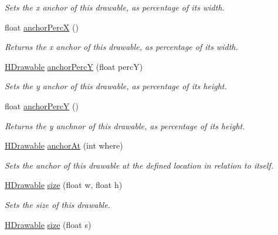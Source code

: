 \begin{DoxyCompactItemize}
\begin{DoxyCompactList}\small\item\em Sets the x anchor of this drawable, as percentage of its width. \end{DoxyCompactList}\item 
float \hyperlink{classhype_1_1drawable_1_1_h_drawable_a4c0158fa8194cfe3424714f16e700b5e}{anchor\-Perc\-X} ()
\begin{DoxyCompactList}\small\item\em Returns the x anchor of this drawable, as percentage of its width. \end{DoxyCompactList}\item 
\hyperlink{classhype_1_1drawable_1_1_h_drawable}{H\-Drawable} \hyperlink{classhype_1_1drawable_1_1_h_drawable_ae376527282453c44731ec7cd31de5f76}{anchor\-Perc\-Y} (float perc\-Y)
\begin{DoxyCompactList}\small\item\em Sets the y anchor of this drawable, as percentage of its height. \end{DoxyCompactList}\item 
float \hyperlink{classhype_1_1drawable_1_1_h_drawable_ac46830b7986dfc9ad6ddbf923e939bc1}{anchor\-Perc\-Y} ()
\begin{DoxyCompactList}\small\item\em Returns the y anchnor of this drawable, as percentage of its height. \end{DoxyCompactList}\item 
\hyperlink{classhype_1_1drawable_1_1_h_drawable}{H\-Drawable} \hyperlink{classhype_1_1drawable_1_1_h_drawable_a6d95df0dfd78df98ac6036a30d73f411}{anchor\-At} (int where)
\begin{DoxyCompactList}\small\item\em Sets the anchor of this drawable at the defined location in relation to itself. \end{DoxyCompactList}\item 
\hyperlink{classhype_1_1drawable_1_1_h_drawable}{H\-Drawable} \hyperlink{classhype_1_1drawable_1_1_h_drawable_a2d458cc012ce0421b443879baf054d0d}{size} (float w, float h)
\begin{DoxyCompactList}\small\item\em Sets the size of this drawable. \end{DoxyCompactList}\item 
\hyperlink{classhype_1_1drawable_1_1_h_drawable}{H\-Drawable} \hyperlink{classhype_1_1drawable_1_1_h_drawable_a249872347d0d2fca46d5cabee5d2c491}{size} (float s)

\end{DoxyCompactItemize}
